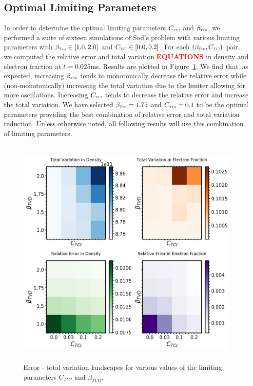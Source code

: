 \documentclass[onecolumn]{aastex62}
\newcommand{\TVD}{\textnormal{\tiny\textsc{Tvd}}}
\newcommand{\TCI}{\textnormal{\tiny\textsc{TCI}}}
\begin{document}
\subsection{Optimal Limiting Parameters}
\label{sec:param}
In order to determine the optimal limiting parameters $C_{\TCI}$ and $\beta_{\TVD}$,
we performed a suite of sixteen simulations of Sod's problem with various
limiting parameters with $\beta_{\TVD}\in\left[1.0,2.0\right]$ and
$C_{\TCI}\in\left[0.0,0.2\right]$. For each $\left(\beta_{\TVD},C_{\TCI}\right)$ pair,
we computed the relative error and total variation \textbf{\textcolor{red}{EQUATIONS}} in density and electron
fraction at $t = 0.025$ms. Results are plotted in Figure~\ref{fig:landscape}.
We find that, as expected, increasing $\beta_{\TVD}$ tends to monotonically
decrease the relative error while (non-monotonically) increasing the total variation due to the
limiter allowing for more oscillations. Increasing $C_{\TCI}$ tends to decrease
the relative error and increase the total variation.
We have selected
$\beta_{\TVD}=1.75$ and $C_{\TCI}=0.1$ to be the optimal parameters providing
the best combination of relative error and total variation reduction. Unless
otherwise noted, all following results will use this combination of limiting
parameters.

\begin{figure}[b]
  \centering
  \includegraphics[width=32pc, height=27.5pc]{./figures/error_tv_landscape.png}
  \caption{\label{fig:landscape} Error - total variation landscapes for various
  values of the limiting parameters $C_{TCI}$ and $\beta_{TVD}$.}
\end{figure}
\end{document}

